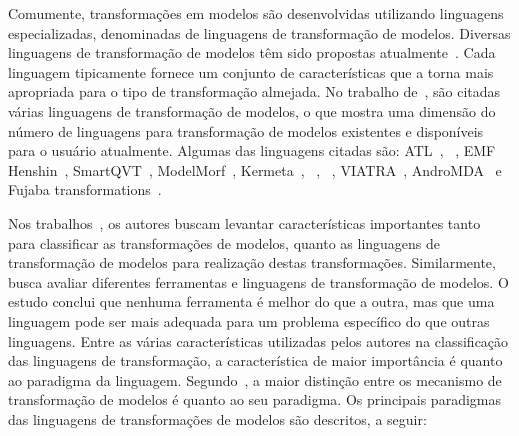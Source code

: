 Comumente, transformações em modelos são desenvolvidas utilizando linguagens especializadas, denominadas de linguagens de transformação de modelos. Diversas linguagens de transformação de modelos têm sido propostas atualmente~\cite{Allilaire_06, Biehl_2010}. Cada linguagem tipicamente fornece um conjunto de características que a torna mais apropriada para o tipo de transformação almejada. No trabalho de~, são citadas várias linguagens de transformação de modelos, o que mostra uma dimensão do número de linguagens para transformação de modelos existentes e disponíveis para o usuário atualmente. Algumas das linguagens citadas são: ATL~\cite{ATL_eclipse,Jouault_2008}, ~\cite{QVT:OMG}, EMF Henshin~\cite{EMF_Henshin}, SmartQVT~\cite{SmartQVT}, ModelMorf~\cite{ModelMorf}, Kermeta~\cite{kermeta}, ~\cite{ETL_eclipse}, ~\cite{OpenArchitectureWare}, VIATRA~\cite{viatra}, AndroMDA~\cite{andromda} e Fujaba transformations~\cite{fujaba}.

Nos trabalhos~\cite{Biehl_2010, Mens_2006, Allilaire_06}, os autores buscam levantar características importantes tanto para classificar as transformações de modelos, quanto as linguagens de transformação de modelos  para realização destas transformações. Similarmente,~ busca avaliar diferentes ferramentas e linguagens de transformação de modelos. O estudo conclui que nenhuma ferramenta é melhor do que a outra, mas que uma linguagem pode ser mais adequada para um problema específico do que outras linguagens. Entre as várias características utilizadas pelos autores na classificação das linguagens de transformação, a característica de maior importância é quanto ao paradigma da linguagem. Segundo~, a maior distinção entre os mecanismo de transformação de modelos é quanto ao seu paradigma. Os principais paradigmas das linguagens de transformações de modelos são descritos, a seguir:

